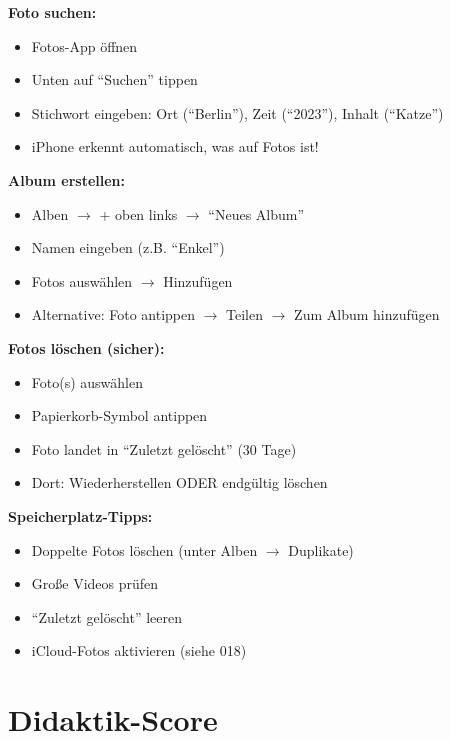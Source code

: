 \documentclass[11pt,a4paper]{article}
\begin{document}
\textbf{Foto suchen:}
\begin{itemize}
    \item Fotos-App öffnen
    \item Unten auf ``Suchen'' tippen
    \item Stichwort eingeben: Ort (``Berlin''), Zeit (``2023''), Inhalt (``Katze'')
    \item iPhone erkennt automatisch, was auf Fotos ist!
\end{itemize}

\textbf{Album erstellen:}
\begin{itemize}
    \item Alben $\rightarrow$ + oben links $\rightarrow$ ``Neues Album''
    \item Namen eingeben (z.B. ``Enkel'')
    \item Fotos auswählen $\rightarrow$ Hinzufügen
    \item Alternative: Foto antippen $\rightarrow$ Teilen $\rightarrow$ Zum Album hinzufügen
\end{itemize}

\textbf{Fotos löschen (sicher):}
\begin{itemize}
    \item Foto(s) auswählen
    \item Papierkorb-Symbol antippen
    \item Foto landet in ``Zuletzt gelöscht'' (30 Tage)
    \item Dort: Wiederherstellen ODER endgültig löschen
\end{itemize}

\textbf{Speicherplatz-Tipps:}
\begin{itemize}
    \item Doppelte Fotos löschen (unter Alben $\rightarrow$ Duplikate)
    \item Große Videos prüfen
    \item ``Zuletzt gelöscht'' leeren
    \item iCloud-Fotos aktivieren (siehe 018)
\end{itemize}

\section{Didaktik-Score}
\end{document}
